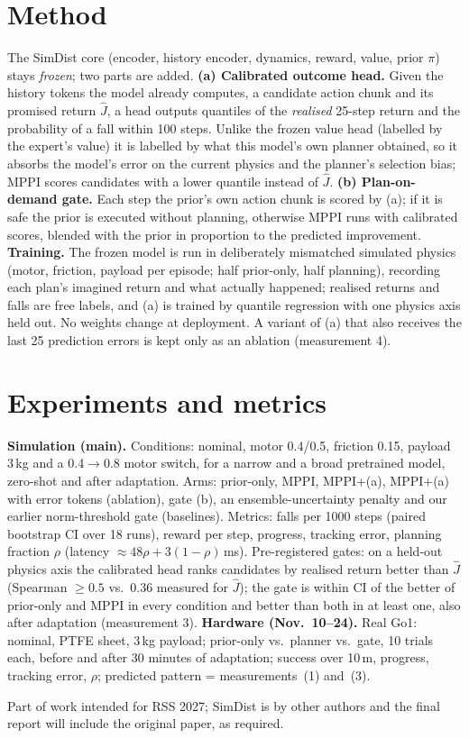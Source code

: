 \documentclass[conference]{IEEEtran}
\begin{document}
\section{Method}
The SimDist core (encoder, history encoder, dynamics, reward, value, prior $\pi$) stays \emph{frozen}; two parts are added.
\textbf{(a) Calibrated outcome head.} Given the history tokens the model already computes, a candidate action chunk and its promised return $\hat J$, a head outputs quantiles of the \emph{realised} 25-step return and the probability of a fall within 100 steps. Unlike the frozen value head (labelled by the expert's value) it is labelled by what this model's own planner obtained, so it absorbs the model's error on the current physics and the planner's selection bias; MPPI scores candidates with a lower quantile instead of $\hat J$.
\textbf{(b) Plan-on-demand gate.} Each step the prior's own action chunk is scored by (a); if it is safe the prior is executed without planning, otherwise MPPI runs with calibrated scores, blended with the prior in proportion to the predicted improvement.
\textbf{Training.} The frozen model is run in deliberately mismatched simulated physics (motor, friction, payload per episode; half prior-only, half planning), recording each plan's imagined return and what actually happened; realised returns and falls are free labels, and (a) is trained by quantile regression with one physics axis held out. No weights change at deployment. A variant of (a) that also receives the last 25 prediction errors is kept only as an ablation (measurement 4).

\section{Experiments and metrics}
\textbf{Simulation (main).} Conditions: nominal, motor 0.4/0.5, friction 0.15, payload 3\,kg and a 0.4$\to$0.8 motor switch, for a narrow and a broad pretrained model, zero-shot and after adaptation. Arms: prior-only, MPPI, MPPI+(a), MPPI+(a) with error tokens (ablation), gate (b), an ensemble-uncertainty penalty and our earlier norm-threshold gate (baselines). Metrics: falls per 1000 steps (paired bootstrap CI over 18 runs), reward per step, progress, tracking error, planning fraction $\rho$ (latency $\approx 48\rho + 3(1-\rho)$\,ms). Pre-registered gates: on a held-out physics axis the calibrated head ranks candidates by realised return better than $\hat J$ (Spearman $\ge 0.5$ vs.\ 0.36 measured for $\hat J$); the gate is within CI of the better of prior-only and MPPI in every condition and better than both in at least one, also after adaptation (measurement 3).
\textbf{Hardware (Nov.\ 10--24).} Real Go1: nominal, PTFE sheet, 3\,kg payload; prior-only vs.\ planner vs.\ gate, 10 trials each, before and after 30 minutes of adaptation; success over 10\,m, progress, tracking error, $\rho$; predicted pattern = measurements~(1) and~(3).

\noindent\footnotesize Part of work intended for RSS 2027; SimDist is by other authors and the final report will include the original paper, as required.
\end{document}
